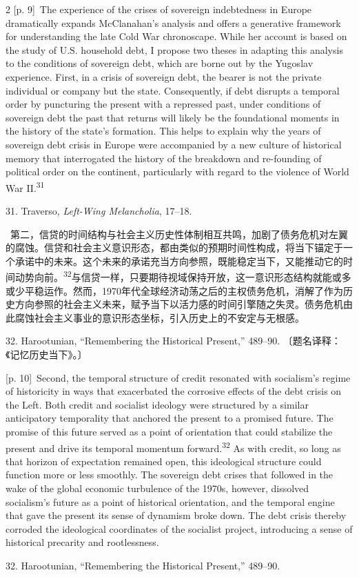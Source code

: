 \documentclass[10pt,a4paper]{article}
\begin{document}
\begin{paracol}{2}
\switchcolumn
{\scriptsize\color{gray} [p. 9]}\ The experience of the crises of sovereign indebtedness in Europe dramatically expands McClanahan’s analysis and offers a generative framework for understanding the late Cold War chronoscape. While her account is based on the study of U.S. household debt, I propose two theses in adapting this analysis to the conditions of sovereign debt, which are borne out by the Yugoslav experience. First, in a crisis of sovereign debt, the bearer is not the private individual or company but the state. Consequently, if debt disrupts a temporal order by puncturing the present with a repressed past, under conditions of sovereign debt the past that returns will likely be the foundational moments in the history of the state’s formation. This helps to explain why the years of sovereign debt crisis in Europe were accompanied by a new culture of historical memory that interrogated the history of the breakdown and re-founding of political order on the continent, particularly with regard to the violence of World War II.\nobreak\textsuperscript{31}\par{\small 31. Traverso, \textit{Left-Wing Melancholia}, 17–18.\par}
\switchcolumn*
{\scriptsize\color{gray} [p. 10]}\ 第二，信贷的时间结构与社会主义历史性体制相互共鸣，加剧了债务危机对左翼的腐蚀。信贷和社会主义意识形态，都由类似的预期时间性构成，将当下锚定于一个承诺中的未来。这个未来的承诺充当方向参照，既能稳定当下，又能推动它的时间动势向\mbox{前。\textsuperscript{32}}与信贷一样，只要期待视域保持开放，这一意识形态结构就能或多或少平稳运作。然而，1970年代全球经济动荡之后的主权债务危机，消解了作为历史方向参照的社会主义未来，赋予当下以活力感的时间引擎随之失灵。债务危机由此腐蚀社会主义事业的意识形态坐标，引入历史上的不安定与无根感。\par{\small 32. Harootunian, “Remembering the Historical Present,” 489–90. 〔题名译释：《记忆历史当下》。〕\par}
\switchcolumn
{\scriptsize\color{gray} [p. 10]}\ Second, the temporal structure of credit resonated with socialism’s regime of historicity in ways that exacerbated the corrosive effects of the debt crisis on the Left. Both credit and socialist ideology were structured by a similar anticipatory temporality that anchored the present to a promised future. The promise of this future served as a point of orientation that could stabilize the present and drive its temporal momentum forward.\nobreak\textsuperscript{32} As with credit, so long as that horizon of expectation remained open, this ideological structure could function more or less smoothly. The sovereign debt crises that followed in the wake of the global economic turbulence of the 1970s, however, dissolved socialism’s future as a point of historical orientation, and the temporal engine that gave the present its sense of dynamism broke down. The debt crisis thereby corroded the ideological coordinates of the socialist project, introducing a sense of historical precarity and rootlessness.\par{\small 32. Harootunian, “Remembering the Historical Present,” 489–90.\par}

\end{paracol}
\end{document}
